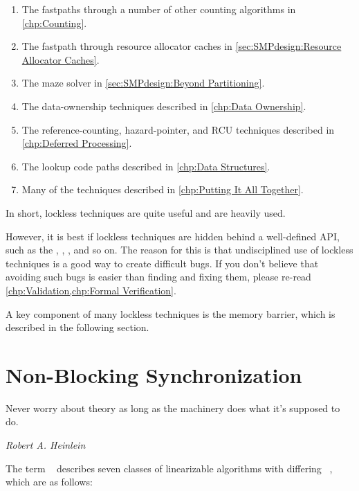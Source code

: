 \begin{enumerate}
\item	The fastpaths through a number of other counting algorithms
	in \cref{chp:Counting}.
\item	The fastpath through resource allocator caches in
	\cref{sec:SMPdesign:Resource Allocator Caches}.
\item	The maze solver in \cref{sec:SMPdesign:Beyond Partitioning}.
\item	The data-ownership techniques described in
	\cref{chp:Data Ownership}.
\item	The reference-counting, hazard-pointer, and RCU techniques
	described in \cref{chp:Deferred Processing}.
\item	The lookup code paths described in \cref{chp:Data Structures}.
\item	Many of the techniques described in
	\cref{chp:Putting It All Together}.
\end{enumerate}

In short, lockless techniques are quite useful and are heavily used.

However, it is best if lockless techniques are hidden behind a
well-defined API, such as the , ,
, and so on.
The reason for this is that undisciplined use of lockless techniques
is a good way to create difficult bugs.
If you don't believe that avoiding such bugs is easier than finding
and fixing them, please re-read
\cref{chp:Validation,chp:Formal Verification}.

A key component of many lockless techniques is the memory barrier,
which is described in the following section.

\section{Non-Blocking Synchronization}
\label{sec:advsync:Non-Blocking Synchronization}
%
\epigraph{Never worry about theory as long as the machinery does what
	  it's supposed to do.}
	 {\emph{Robert A. Heinlein}}

The term ~\cite{Herlihy90}
describes seven classes of linearizable algorithms with differing
\emph{}~\cite{DanAlitarh2013PracticalProgress},
which are as follows:

